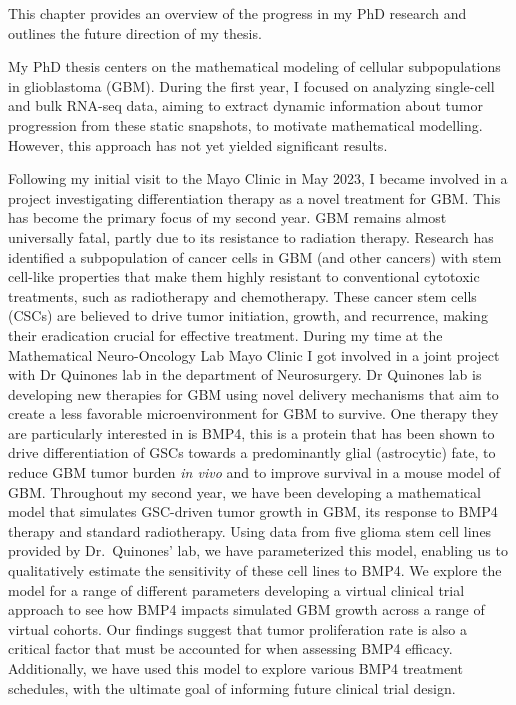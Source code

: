 \documentclass[
  letterpaper,
]{scrreprt}
\theoremstyle{definition}
\theoremstyle{remark}
\begin{document}
This chapter provides an overview of the progress in my PhD research and
outlines the future direction of my thesis.

My PhD thesis centers on the mathematical modeling of cellular
subpopulations in glioblastoma (GBM). During the first year, I focused
on analyzing single-cell and bulk RNA-seq data, aiming to extract
dynamic information about tumor progression from these static snapshots,
to motivate mathematical modelling. However, this approach has not yet
yielded significant results.

Following my initial visit to the Mayo Clinic in May 2023, I became
involved in a project investigating differentiation therapy as a novel
treatment for GBM. This has become the primary focus of my second year.
GBM remains almost universally fatal, partly due to its resistance to
radiation therapy. Research has identified a subpopulation of cancer
cells in GBM (and other cancers) with stem cell-like properties that
make them highly resistant to conventional cytotoxic treatments, such as
radiotherapy and chemotherapy. These cancer stem cells (CSCs) are
believed to drive tumor initiation, growth, and recurrence, making their
eradication crucial for effective treatment. During my time at the
Mathematical Neuro-Oncology Lab Mayo Clinic I got involved in a joint
project with Dr Quinones lab in the department of Neurosurgery. Dr
Quinones lab is developing new therapies for GBM using novel delivery
mechanisms that aim to create a less favorable microenvironment for GBM
to survive. One therapy they are particularly interested in is BMP4,
this is a protein that has been shown to drive differentiation of GSCs
towards a predominantly glial (astrocytic) fate, to reduce GBM tumor
burden \emph{in vivo} and to improve survival in a mouse model of GBM.
Throughout my second year, we have been developing a mathematical model
that simulates GSC-driven tumor growth in GBM, its response to BMP4
therapy and standard radiotherapy. Using data from five glioma stem cell
lines provided by Dr.~Quinones' lab, we have parameterized this model,
enabling us to qualitatively estimate the sensitivity of these cell
lines to BMP4. We explore the model for a range of different parameters
developing a virtual clinical trial approach to see how BMP4 impacts
simulated GBM growth across a range of virtual cohorts. Our findings
suggest that tumor proliferation rate is also a critical factor that
must be accounted for when assessing BMP4 efficacy. Additionally, we
have used this model to explore various BMP4 treatment schedules, with
the ultimate goal of informing future clinical trial design.
\end{document}
